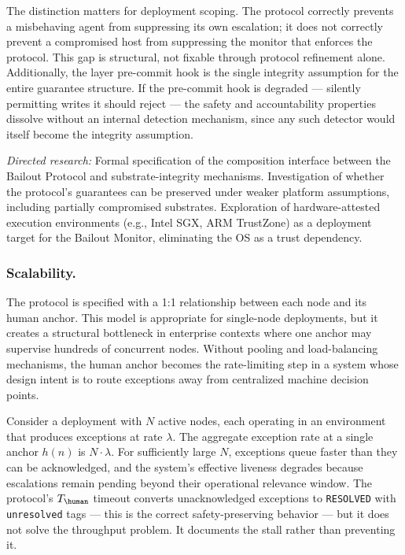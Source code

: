 The distinction matters for deployment scoping. The protocol correctly prevents a misbehaving agent from suppressing its own escalation; it does not correctly prevent a compromised host from suppressing the monitor that enforces the protocol. This gap is structural, not fixable through protocol refinement alone. Additionally, the \fact{} layer pre-commit hook is the single integrity assumption for the entire guarantee structure. If the pre-commit hook is degraded — silently permitting writes it should reject — the safety and accountability properties dissolve without an internal detection mechanism, since any such detector would itself become the integrity assumption.

\textit{Directed research:} Formal specification of the composition interface between the Bailout Protocol and substrate-integrity mechanisms. Investigation of whether the protocol's guarantees can be preserved under weaker platform assumptions, including partially compromised substrates. Exploration of hardware-attested execution environments (e.g., Intel SGX, ARM TrustZone) as a deployment target for the Bailout Monitor, eliminating the OS as a trust dependency.

\subsubsection{Scalability.}
The protocol is specified with a 1:1 relationship between each node and its human anchor. This model is appropriate for single-node deployments, but it creates a structural bottleneck in enterprise contexts where one anchor may supervise hundreds of concurrent nodes. Without pooling and load-balancing mechanisms, the human anchor becomes the rate-limiting step in a system whose design intent is to route exceptions away from centralized machine decision points.

Consider a deployment with $N$ active nodes, each operating in an environment that produces exceptions at rate $\lambda$. The aggregate exception rate at a single anchor $h(n)$ is $N \cdot \lambda$. For sufficiently large $N$, exceptions queue faster than they can be acknowledged, and the system's effective liveness degrades because escalations remain pending beyond their operational relevance window. The protocol's $T_{\human}$ timeout converts unacknowledged exceptions to \texttt{RESOLVED} with \texttt{unresolved} tags — this is the correct safety-preserving behavior — but it does not solve the throughput problem. It documents the stall rather than preventing it.

